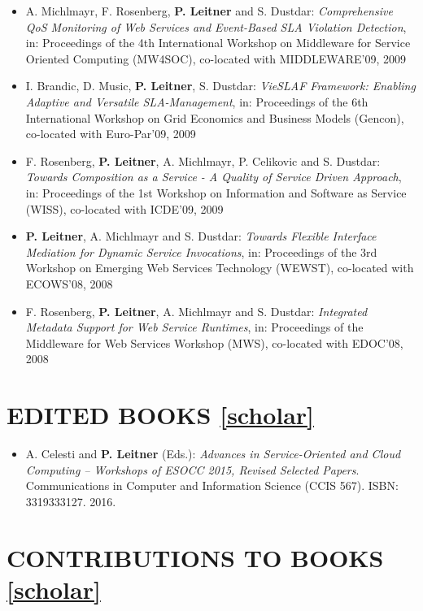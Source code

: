\documentclass[paper=letter,fontsize=11pt]{scrartcl} %
\newcommand{\NewPart}[2]{\section*{\uppercase{#1} #2}}
\begin{document}
\begin{itemize}
\item A. Michlmayr, F. Rosenberg, \textbf{P. Leitner} and S. Dustdar: \emph{Comprehensive QoS Monitoring of Web Services and Event-Based SLA Violation Detection}, in: Proceedings of the 4th International Workshop on Middleware for Service Oriented Computing (MW4SOC), co-located with MIDDLEWARE'09, 2009
\item I. Brandic, D. Music, \textbf{P. Leitner}, S. Dustdar: \emph{VieSLAF Framework: Enabling Adaptive and Versatile SLA-Management}, in: Proceedings of the 6th International Workshop on Grid Economics and Business Models (Gencon), co-located with Euro-Par'09, 2009
\item F. Rosenberg, \textbf{P. Leitner}, A. Michlmayr, P. Celikovic and S. Dustdar: \emph{Towards Composition as a Service - A Quality of Service Driven Approach}, in: Proceedings of the 1st Workshop on Information and Software as Service (WISS), co-located with ICDE'09, 2009
\item \textbf{P. Leitner}, A. Michlmayr and S. Dustdar: \emph{Towards Flexible Interface Mediation for Dynamic Service Invocations}, in: Proceedings of the 3rd Workshop on Emerging Web Services Technology (WEWST), co-located with ECOWS'08, 2008
\item F. Rosenberg, \textbf{P. Leitner}, A. Michlmayr and S. Dustdar: \emph{Integrated Metadata Support for Web Service Runtimes}, in: Proceedings of the Middleware for Web Services Workshop (MWS), co-located with EDOC'08, 2008
\end{itemize}

\NewPart{Edited Books}{\href{https://scholar.google.ch/citations?user=wZ9f8CAAAAAJ}{[scholar]}}

\begin{itemize}
	\item A. Celesti and \textbf{P. Leitner} (Eds.): \emph{Advances in
  Service-Oriented and Cloud Computing -- Workshops of ESOCC 2015, Revised Selected Papers}.
Communications in Computer and Information Science (CCIS 567). ISBN: 3319333127. 2016.

\end{itemize}

\NewPart{Contributions to Books}{\href{https://scholar.google.ch/citations?user=wZ9f8CAAAAAJ}{[scholar]}}
\end{document}

